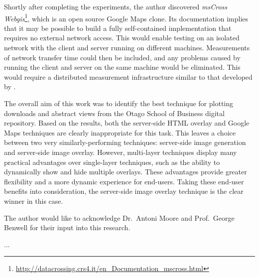 \documentclass[acmnow]{acmtrans2m}
\begin{document}
Shortly after completing the experiments, the author discovered
\emph{msCross Webgis}\footnote{\url{http://datacrossing.crs4.it/en_Documentation_mscross.html}},
which is an open source Google Maps clone. Its documentation implies
that it may be possible to build a fully self-contained implementation
that requires no external network access. This would enable testing on
an isolated network with the client and server running on different
machines. Measurements of network transfer time could then be included,
and any problems caused by running the client and server on the same
machine would be eliminated. This would require a distributed
measurement infrastructure similar to that developed by
.

The overall aim of this work was to identify the best technique for
plotting downloads and abstract views from the Otago School of Business
digital repository. Based on the results, both the server-side HTML
overlay and Google Maps techniques are clearly inappropriate for this
task. This leaves a choice between two very similarly-performing
techniques: server-side image generation and server-side image overlay.
However, multi-layer techniques display many practical advantages over
single-layer techniques, such as the ability to dynamically show and
hide multiple overlays. These advantages provide greater flexibility and
a more dynamic experience for end-users. Taking these end-user benefits
into consideration, the server-side image overlay technique is the clear
winner in this case.


\begin{acks}
The author would like to acknowledge Dr.\ Antoni Moore and Prof.\ George
Benwell for their input into this research.
\end{acks}





\begin{received}
...
\end{received}
\end{document}
